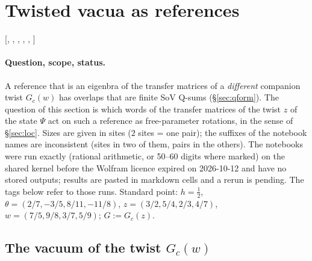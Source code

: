 \section{Twisted vacua as references}\label{sec:twvac}

{\raggedright [, , ,
, , ]\par}

\paragraph{Question, scope, status.} A reference that is an eigenbra of the transfer matrices of a \emph{different} companion twist
$G_c(w)$ has overlaps that are finite SoV Q-sums (\S\ref{sec:qform}). The question of this section is which words of the transfer
matrices of the twist $z$ of the state $\Psi$ act on such a reference as free-parameter rotations, in the sense of \S\ref{sec:loc}. Sizes
are given in sites ($2$ sites = one pair); the suffixes of the notebook names are inconsistent (sites in two of them, pairs in the others).
The notebooks were run exactly (rational arithmetic, or 50--60 digits where marked) on the shared kernel before the Wolfram licence expired
on 2026-10-12 and have no stored outputs; results are pasted in markdown cells and a rerun is pending. The tags below refer to those runs.
Standard point: $h=\frac12$, $\theta=(2/7,-3/5,8/11,-11/8)$, $z=(3/2,5/4,2/3,4/7)$, $w=(7/5,9/8,3/7,5/9)$; $G:=G_c(z)$.

\subsection{The vacuum of the twist \texorpdfstring{$G_c(w)$}{G\_c(w)}}\label{sec:twvac-def}

